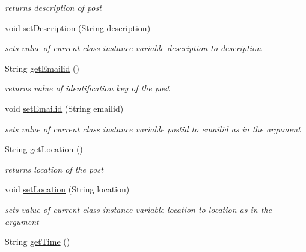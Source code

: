 \begin{DoxyCompactItemize}
\begin{DoxyCompactList}\small\item\em returns description of post \end{DoxyCompactList}\item 
void \hyperlink{classcom_1_1example_1_1sel_1_1lostfound_1_1Posts_a87b84ac76aa2e515539c56dae47deb0e}{set\+Description} (String description)
\begin{DoxyCompactList}\small\item\em sets value of current class instance variable description to description \end{DoxyCompactList}\item 
String \hyperlink{classcom_1_1example_1_1sel_1_1lostfound_1_1Posts_a5e2d129ec9e284266903f74ae62204f7}{get\+Emailid} ()\hypertarget{classcom_1_1example_1_1sel_1_1lostfound_1_1Posts_a5e2d129ec9e284266903f74ae62204f7}{}\label{classcom_1_1example_1_1sel_1_1lostfound_1_1Posts_a5e2d129ec9e284266903f74ae62204f7}

\begin{DoxyCompactList}\small\item\em returns value of identification key of the post \end{DoxyCompactList}\item 
void \hyperlink{classcom_1_1example_1_1sel_1_1lostfound_1_1Posts_a0c9abbc2a59af08f0e53f2b82cb4bc47}{set\+Emailid} (String emailid)
\begin{DoxyCompactList}\small\item\em sets value of current class instance variable postid to emailid as in the argument \end{DoxyCompactList}\item 
String \hyperlink{classcom_1_1example_1_1sel_1_1lostfound_1_1Posts_a3ca78a6e83c54589f33938cc3ee6bb0b}{get\+Location} ()\hypertarget{classcom_1_1example_1_1sel_1_1lostfound_1_1Posts_a3ca78a6e83c54589f33938cc3ee6bb0b}{}\label{classcom_1_1example_1_1sel_1_1lostfound_1_1Posts_a3ca78a6e83c54589f33938cc3ee6bb0b}

\begin{DoxyCompactList}\small\item\em returns location of the post \end{DoxyCompactList}\item 
void \hyperlink{classcom_1_1example_1_1sel_1_1lostfound_1_1Posts_aeb555f12a9699a1f20856055e40338a5}{set\+Location} (String location)
\begin{DoxyCompactList}\small\item\em sets value of current class instance variable location to location as in the argument \end{DoxyCompactList}\item 
String \hyperlink{classcom_1_1example_1_1sel_1_1lostfound_1_1Posts_a25287d67ca688f18f480a66abeb83525}{get\+Time} ()\hypertarget{classcom_1_1example_1_1sel_1_1lostfound_1_1Posts_a25287d67ca688f18f480a66abeb83525}{}\label{classcom_1_1example_1_1sel_1_1lostfound_1_1Posts_a25287d67ca688f18f480a66abeb83525}


\end{DoxyCompactItemize}
